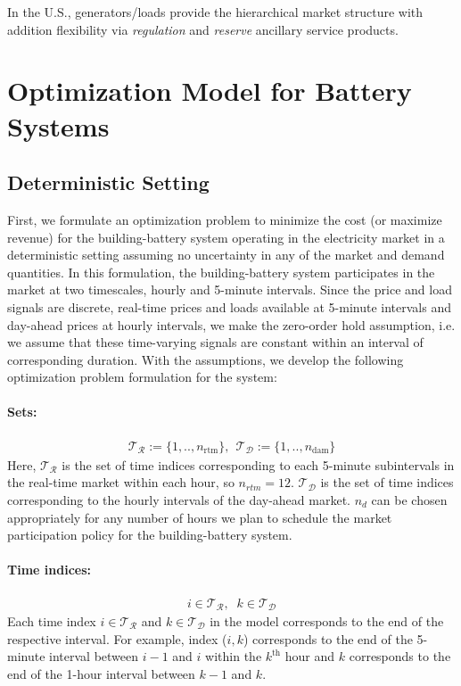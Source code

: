 \documentclass[11pt,twoside]{article}
\begin{document}
In the U.S., generators/loads provide the hierarchical market structure with addition flexibility via \emph{regulation} and \emph{reserve} ancillary service products. 

\section{Optimization Model for Battery Systems}\label{sec:model}
\subsection{Deterministic Setting}
First, we formulate an optimization problem to minimize the cost (or maximize revenue) for the building-battery system operating in the electricity market in a deterministic setting assuming no uncertainty in any of the market and demand quantities. In this formulation, the building-battery system participates in the market at two timescales, hourly and 5-minute intervals. Since the price and load signals are discrete, real-time prices and loads available at 5-minute intervals and day-ahead prices at hourly intervals, we make the zero-order hold assumption, i.e. we assume that these time-varying signals are constant within an interval of corresponding duration. With the assumptions, we develop the following optimization problem formulation for the system:   \\
\paragraph{Sets:}
\begin{subequations}
\begin{align}
\mathcal{T_R} := \{1,..,n_{\textrm{rtm}}\},\,\; \mathcal{T_D} :=  \{1,..,n_{\textrm{dam}}\}
\end{align}
\end{subequations}
Here, $\mathcal{T_R}$ is the set of time indices corresponding to each 5-minute subintervals in the real-time market within each hour, so $n_{rtm}=12$. $\mathcal{T_D}$ is the set of time indices corresponding to the hourly intervals of the day-ahead market. $n_d$ can be chosen appropriately for any number of hours we plan to schedule the market participation policy for the building-battery system.\\
\paragraph{Time indices:}
\begin{subequations}
\begin{align}
i \in \mathcal{T_R}, \;\; k \in \mathcal{T_D}
\end{align}
\end{subequations}
Each time index $i \in \mathcal{T_R}$ and $k \in \mathcal{T_D}$ in the model corresponds to the end of the respective interval. For example, index ($i,k$) corresponds to the end of the 5-minute interval between $i-1$ and $i$ within the $k^\textrm{th}$ hour and $k$ corresponds to the end of the 1-hour interval between $k-1$ and $k$.
\end{document}
